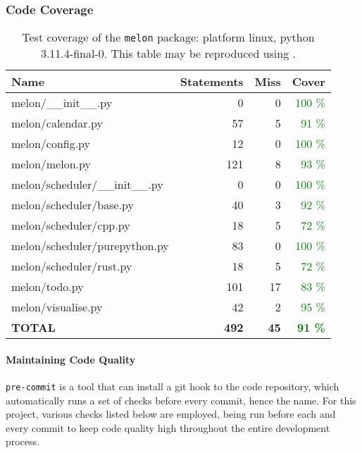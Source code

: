 \subsubsection{Code Coverage}
\begin{table}
  \centering
  \caption{Test coverage of the \texttt{melon} package: platform linux, python 3.11.4-final-0. This table may be reproduced using .}
  \begin{tabular}{lrrr}
    \hline
    \bf Name                        & \bf Statements & \bf Miss & \bf Cover                    \\
    \hline
    melon/\_\_init\_\_.py           & 0              & 0        & \textcolor{green}{100 \%}    \\
    melon/calendar.py               & 57             & 5        & \textcolor{green}{91 \%}     \\
    melon/config.py                 & 12             & 0        & \textcolor{green}{100 \%}    \\
    melon/melon.py                  & 121            & 8        & \textcolor{green}{93 \%}     \\
    melon/scheduler/\_\_init\_\_.py & 0              & 0        & \textcolor{green}{100 \%}    \\
    melon/scheduler/base.py         & 40             & 3        & \textcolor{green}{92 \%}     \\
    melon/scheduler/cpp.py          & 18             & 5        & \textcolor{green}{72 \%}     \\
    melon/scheduler/purepython.py   & 83             & 0        & \textcolor{green}{100 \%}    \\
    melon/scheduler/rust.py         & 18             & 5        & \textcolor{green}{72 \%}     \\
    melon/todo.py                   & 101            & 17       & \textcolor{green}{83 \%}     \\
    melon/visualise.py              & 42             & 2        & \textcolor{green}{95 \%}     \\
    \hline
    \bf TOTAL                       & \bf 492        & \bf 45   & \bf \textcolor{green}{91 \%}
  \end{tabular}
\end{table}

\paragraph{Maintaining Code Quality}
\texttt{pre-commit} is a tool that can install a git hook to the code repository, which automatically runs a set of checks before every commit, hence the name.
For this project, various checks listed below are employed, being run before each and every commit to keep code quality high throughout the entire development process.

